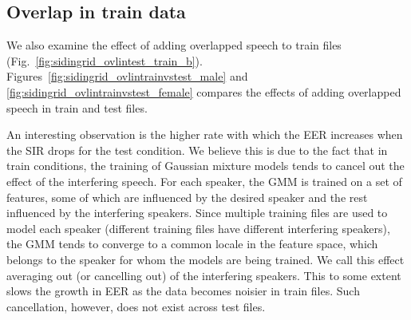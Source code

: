 \subsection{Overlap in train data}
\label{ssec:ch2_OvlinTrain}
We also examine the effect of adding overlapped speech to train files (Fig.~\ref{fig:sidingrid_ovlintest_train_b}). 
Figures~\ref{fig:sidingrid_ovlintrainvstest_male} and \ref{fig:sidingrid_ovlintrainvstest_female} compares the effects of adding overlapped speech in train and test files. 

An interesting observation is the higher rate with which the EER increases when the SIR drops for the test condition. 
We believe this is due to the fact that in train conditions, the training of Gaussian mixture models tends to cancel out the effect of the interfering speech. 
For each speaker, the GMM is trained on a set of features, some of which are influenced by the desired speaker and the rest influenced by the interfering speakers. 
Since multiple training files are used to model each speaker (different training files have different interfering speakers), the GMM tends to converge to a common locale in the feature space, which belongs to the speaker for whom the models are being trained. 
We call this effect averaging out (or cancelling out) of the interfering speakers. 
This to some extent slows the growth in EER as the data becomes noisier in train files. 
Such cancellation, however, does not exist across test files.



